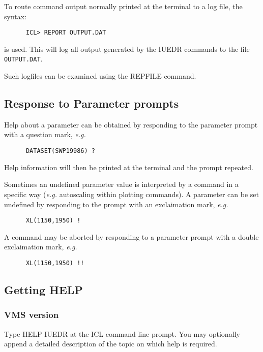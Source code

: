 To route command output normally printed at the terminal to a log
file, the syntax:

\begin{verbatim}
      ICL> REPORT OUTPUT.DAT
\end{verbatim}

is used. This will log all output generated by the IUEDR commands to
the  file {\tt OUTPUT.DAT}. 

Such logfiles can be examined using the REPFILE command.

\subsection {Response to Parameter prompts} 

Help about a parameter can
be obtained by responding to the parameter prompt with a question
mark, {\em e.g.}

\begin{verbatim}
      DATASET(SWP19986) ?
\end{verbatim}

Help information will then be printed at the terminal and the prompt
repeated.

Sometimes an undefined parameter value is interpreted by a command in
a specific way ({\em e.g.} autoscaling within plotting commands).  A
parameter can be set undefined by responding to the prompt with an
exclaimation mark, {\em e.g.}

\begin{verbatim}
      XL(1150,1950) !
\end{verbatim}

A command may be aborted by responding to a parameter prompt with a 
double exclaimation mark, {\em e.g.}

\begin{verbatim}
      XL(1150,1950) !!
\end{verbatim}

\subsection {Getting HELP}

\subsubsection{VMS version}

Type HELP IUEDR at the ICL command line prompt. You may optionally
append a detailed description of the topic on which help is required.

